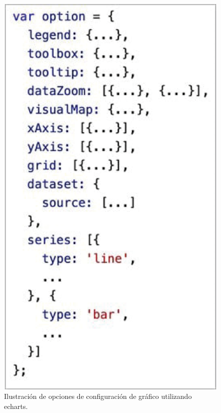 \begin{figure}[htpb]
	\centering
	\includegraphics[scale=.55]{./Figures/echart-grafica-options.png}
	\caption[Opciones de configuración de echarts]{Ilustración de opciones de configuración de gráfico utilizando echarts\protect\footnotemark.}
	\label{fig:echart-grafica-opciones}
\end{figure}




